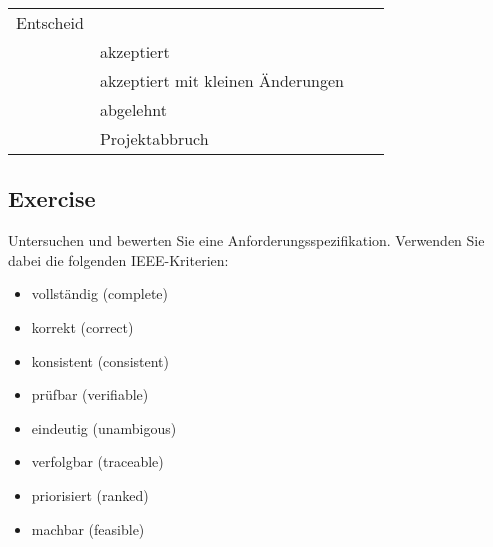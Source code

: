 \newpage
%
\begin{tabular}{llp{5cm}c}
 \hline
\fi
  Entscheid & \\
       &\usebox{\rk} akzeptiert\\
       &\usebox{\rk} akzeptiert mit kleinen \"Anderungen\\
       &\usebox{\rk} abgelehnt\\
       &\usebox{\rk} Projektabbruch\\
\end{tabular}
\newpage
\subsection{Exercise}
Untersuchen und bewerten Sie eine Anforderungsspezifikation. 
Verwenden Sie dabei die folgenden IEEE-Kriterien:
\begin{itemize}
\item vollständig (complete)
\item korrekt (correct)
\item konsistent (consistent)
\item prüfbar (verifiable)
\item eindeutig (unambigous)
\item verfolgbar (traceable)
\item priorisiert (ranked)
\item machbar (feasible)
\end{itemize}
\newslide


%

%
%
%

